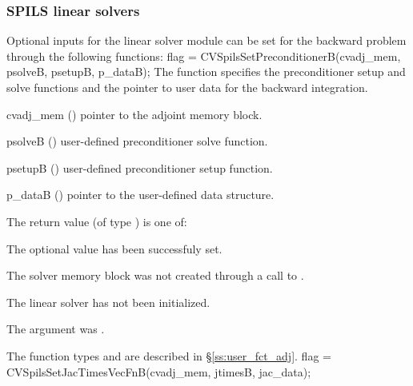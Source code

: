 \subsubsection{SPILS linear solvers}
Optional inputs for the {\cvspils} linear solver module can be set for the backward
problem through the following functions:
{
  flag = CVSpilsSetPreconditionerB(cvadj\_mem, psolveB, psetupB, p\_dataB);
}
{
  The function  specifies the preconditioner
  setup and solve functions and the pointer to user data for the backward integration.
}
{
  \begin{args}
  \item[cvadj\_mem] ()
    pointer to the adjoint memory block.
  \item[psolveB] ()
    user-defined preconditioner solve function.
  \item[psetupB] ()
    user-defined preconditioner setup function.
  \item[p\_dataB] ()
     pointer to the user-defined data structure.
  \end{args}
}
{
  The return value  (of type ) is one of:
  \begin{args}
  \item[\Id{CVSPILS\_SUCCESS}] 
    The optional value has been successfuly set.
  \item[\Id{CVSPILS\_MEM\_NULL}]
    The {\cvodes} solver memory block was not created through a call to .
  \item[\Id{CVSPILS\_LMEM\_NULL}]
    The {\cvspgmr} linear solver has not been initialized.
  \item[\Id{CVSPILS\_ADJMEM\_NULL}]
    The  argument was .
  \end{args}
}
{
   The function types  and  are
   described in \S\ref{ss:user_fct_adj}.
}
{
  flag = CVSpilsSetJacTimesVecFnB(cvadj\_mem, jtimesB, jac\_data);
}
